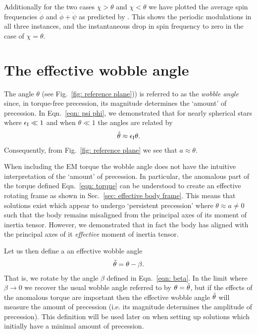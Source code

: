 \documentclass[../full_thesis/full_thesis.tex]{subfiles}
\begin{document}
Additionally for the two cases $\chi>\theta$ and $\chi < \theta$ we have
plotted the average spin frequencies $\dot{\phi}$ and $\dot{\phi}+\dot{\psi}$
as predicted by \citet{Jones2001}. This shows the periodic modulations in all
three instances, and the instantaneous drop in spin frequency to zero in the
case of $\chi=\theta$.

\section{The effective wobble angle}
\label{sec: wobble angle}
The angle $\theta$ (see Fig.~\ref{fig: reference plane})) is referred to as the
\emph{wobble angle} since, in torque-free precession, its magnitude determines
the `amount' of precession.  In Eqn.~\eqref{eqn: psi phi}, we demonstrated that
for nearly spherical stars where $\epsilon_{\mathrm{I}} \ll 1$ and when $\theta \ll 1$ the
angles are related by
\begin{align}
\hat{\theta} \approx \epsilon_{\mathrm{I}}\theta.
\label{eqn: theta hat theta}
\end{align}
Consequently, from Fig.~\ref{fig: reference plane} we see that $a\approx
\theta$.

When including the EM torque the wobble angle
does not have the intuitive interpretation of the `amount' of precession.  In
particular, the anomalous part of the torque defined Eqn.~\eqref{eqn: torque}
can be understood to create an effective rotating frame as shown in Sec.~\ref{sec:
effective body frame}. This means that solutions exist which appear to undergo
`persistent precession' where $\theta \approx a\ne0$ such that the body remains
misaligned from the principal axes of its moment of inertia tensor. However, we
demonstrated that in fact the body has aligned with the principal axes of
it \emph{effective} moment of inertia tensor.

Let us then define a an effective wobble angle
\begin{align}
\tilde{\theta} = \theta - \beta.
\label{eqn: wobble angle}
\end{align}
That is, we rotate by the angle $\beta$ defined in Eqn.~\eqref{eqn: beta}. In
the limit where $\beta \rightarrow 0$ we recover the usual wobble angle referred
to by \citet{Jones2001} $\theta = \tilde{\theta}$, but if the effects of the
anomalous torque are important then the effective wobble angle $\tilde{\theta}$ will
measure the amount of precession (i.e. its magnitude determines the amplitude
of precession). This definition will be used later on when setting up solutions
which initially have a minimal amount of precession.
\end{document}
